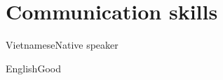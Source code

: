 \documentclass{tccv}
\begin{document}
\section{Communication skills}

\begin{factlist}
\item{Vietnamese}{Native speaker}
\item{English}{Good}
\end{factlist}
\end{document}

